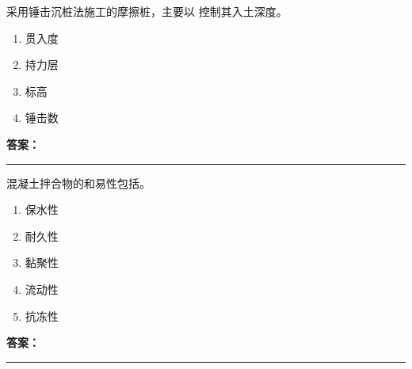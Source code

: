 \documentclass[UTF8,fontset=fandol,11pt]{ctexart}
\newcommand{\answerline}{\textcolor{answerred}{\rule{2.4cm}{0.7pt}}}
\begin{document}
\vspace{0.2em}

\begin{quizbox}[title={乱序第 3 题｜第二章桩基础工程}]

采用锤击沉桩法施工的摩擦桩，主要以 控制其入土深度。\\

\begin{enumerate}[label=\Alph*.]

\item 贯入度

\item 持力层

\item 标高

\item 锤击数

\end{enumerate}

\textbf{\textcolor{answerred}{答案：}} \answerline

\end{quizbox}

\vspace{0.2em}

\begin{quizbox}[title={乱序第 4 题｜第四章混凝土结构工程}]

混凝土拌合物的和易性包括。\\

\begin{enumerate}[label=\Alph*.]

\item 保水性

\item 耐久性

\item 黏聚性

\item 流动性

\item 抗冻性

\end{enumerate}

\textbf{\textcolor{answerred}{答案：}} \answerline

\end{quizbox}

\vspace{0.2em}
\end{document}
